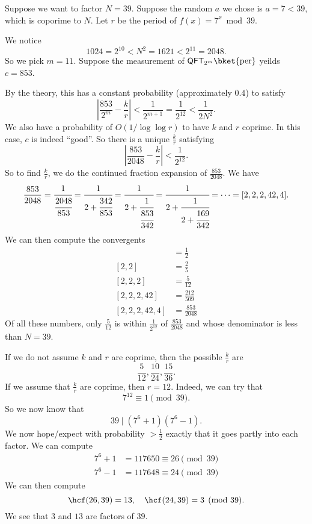 \documentclass[a4paper]{article}
\newcommand{\qQFT}{\mathsf{QFT}}
\begin{document}
\begin{eg}
  Suppose we want to factor $N = 39$. Suppose the random $a$ we chose is $a = 7 < 39$, which is coporime to $N$. Let $r$ be the period of $f(x) = 7^x \bmod 39$.

  We notice
  \[
    1024 = 2^{10} < N^2 = 1621 < 2^{11} = 2048.
  \]
  So we pick $m = 11$. Suppose the measurement of $\qQFT_{2^m}\bket{\mathrm{per}}$ yeilds $c = 853$.

  By the theory, this has a constant probability (approximately $0.4$) to satisfy
  \[
    \left|\frac{853}{2^m} - \frac{k}{r}\right| < \frac{1}{2^{m + 1}} = \frac{1}{2^{12}} < \frac{1}{2N^2}.
  \]
  We also have a probability of $O(1/\log \log r)$ to have $k$ and $r$ coprime. In this case, $c$ is indeed ``good''. So there is a unique $\frac{k}{r}$ satisfying
  \[
    \left|\frac{853}{2048} - \frac{k}{r}\right| < \frac{1}{2^{12}}.
  \]
  So to find $\frac{k}{r}$, we do the continued fraction expansion of $\frac{853}{2048}$. We have
  \[
    \frac{853}{2048} = \cfrac{1}{\cfrac{2048}{853}} = \cfrac{1}{2 + \cfrac{342}{853}} = \cfrac{1}{2 + \cfrac{1}{\cfrac{853}{342}}} = \cfrac{1}{2 + \cfrac{1}{2 + \cfrac{169}{342}}} = \cdots = [2, 2, 2, 42, 4].
  \]
  We can then compute the convergents
  \begin{align*}
    [2] &= \frac{1}{2}\\
    [2, 2] &= \frac{2}{5}\\
    [2, 2, 2] &= \frac{5}{12}\\
    [2, 2, 2, 42] &= \frac{212}{509}\\
    [2, 2, 2, 42, 4] &= \frac{853}{2048}
  \end{align*}
  Of all these numbers, only $\frac{5}{12}$ is within $\frac{1}{2^{12}}$ of $\frac{853}{2048}$ and whose denominator is less than $N = 39$.

  If we do not assume $k$ and $r$ are coprime, then the possible $\frac{k}{r}$ are
  \[
    \frac{5}{12}, \frac{10}{24}, \frac{15}{36}.
  \]
  If we assume that $\frac{k}{r}$ are coprime, then $r = 12$. Indeed, we can try that
  \[
    7^{12} \equiv 1 \pmod {39}.
  \]
  So we now know that
  \[
    39 \mid (7^6 + 1)(7^6 - 1).
  \]
  We now hope/expect with probability $>\frac{1}{2}$ exactly that it goes partly into each factor. We can compute
  \begin{align*}
    7^6 + 1 &= 117650 \equiv 26 \pmod {39}\\
    7^6 - 1 &= 117648 \equiv 24 \pmod {39}
  \end{align*}
  We can then compute
  \[
    \hcf(26, 39) = 13,\quad \hcf(24, 39) = 3 \pmod {39}.
  \]
  We see that $3$ and $13$ are factors of $39$.
\end{eg}
\end{document}
